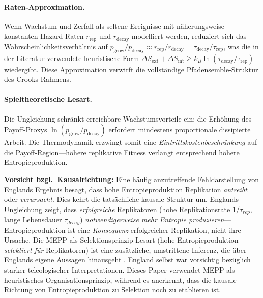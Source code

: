\documentclass[12pt,a4paper]{article}
\theoremstyle{remark}
\begin{document}
\paragraph{Raten-Approximation.} Wenn Wachstum und Zerfall als seltene Ereignisse mit n\"aherungsweise konstanten Hazard-Raten $r_{\mathrm{rep}}$ und $r_{\mathrm{decay}}$ modelliert werden, reduziert sich das Wahrscheinlichkeitsverh\"altnis auf $p_{\mathrm{grow}} / p_{\mathrm{decay}} \approx r_{\mathrm{rep}} / r_{\mathrm{decay}} = \tau_{\mathrm{decay}} / \tau_{\mathrm{rep}}$, was die in der Literatur verwendete heuristische Form $\Delta S_{\mathrm{ext}} + \Delta S_{\mathrm{int}} \geq k_B \ln(\tau_{\mathrm{decay}} / \tau_{\mathrm{rep}})$ wiedergibt. Diese Approximation verwirft die vollst\"andige Pfadensemble-Struktur des Crooks-Rahmens.

\paragraph{Spieltheoretische Lesart.} Die Ungleichung schr\"ankt erreichbare Wachstumsvorteile ein: die Erh\"ohung des Payoff-Proxys $\ln(p_{\mathrm{grow}} / p_{\mathrm{decay}})$ erfordert mindestens proportionale dissipierte Arbeit. Die Thermodynamik erzwingt somit eine \emph{Eintrittskostenbeschr\"ankung} auf die Payoff-Region---h\"ohere replikative Fitness verlangt entsprechend h\"ohere Entropieproduktion.

\textbf{Vorsicht bzgl.\ Kausalrichtung:} Eine h\"aufig anzutreffende Fehldarstellung von Englands Ergebnis besagt, dass hohe Entropieproduktion Replikation \emph{antreibt} oder \emph{verursacht}. Dies kehrt die tats\"achliche kausale Struktur um. Englands Ungleichung zeigt, dass \emph{erfolgreiche} Replikatoren (hohe Replikationsrate $1/\tau_{rep}$, lange Lebensdauer $\tau_{decay}$) \emph{notwendigerweise mehr Entropie produzieren}---Entropieproduktion ist eine \emph{Konsequenz} erfolgreicher Replikation, nicht ihre Ursache. Die MEPP-als-Selektionsprinzip-Lesart (hohe Entropieproduktion \emph{selektiert f\"ur} Replikatoren) ist eine zus\"atzliche, umstrittene Inferenz, die \"uber Englands eigene Aussagen hinausgeht \citep{England2013}. England selbst war vorsichtig bez\"uglich starker teleologischer Interpretationen. Dieses Paper verwendet MEPP als heuristisches Organisationsprinzip, w\"ahrend es anerkennt, dass die kausale Richtung von Entropieproduktion zu Selektion noch zu etablieren ist.
\end{document}
